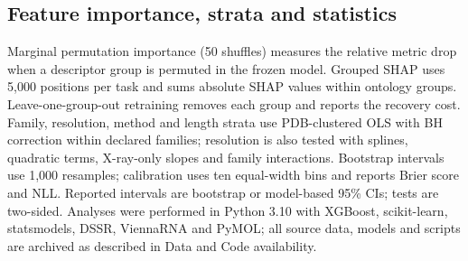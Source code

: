 \subsection{Feature importance, strata and statistics}
Marginal permutation importance (50 shuffles) measures the relative metric drop
when a descriptor group is permuted in the frozen model. Grouped SHAP uses 5,000
positions per task and sums absolute SHAP values within ontology groups.
Leave-one-group-out retraining removes each group and reports the recovery cost.
Family, resolution, method and length strata use PDB-clustered OLS with BH
correction within declared families; resolution is also tested with splines,
quadratic terms, X-ray-only slopes and family interactions. Bootstrap intervals use 1,000 resamples; calibration uses ten equal-width bins
and reports Brier score and NLL.
Reported intervals are bootstrap or model-based 95\% CIs; tests are two-sided. Analyses were performed in
Python 3.10 with XGBoost, scikit-learn, statsmodels, DSSR, ViennaRNA and PyMOL;
all source data, models and scripts are archived as described in Data and Code
availability.
